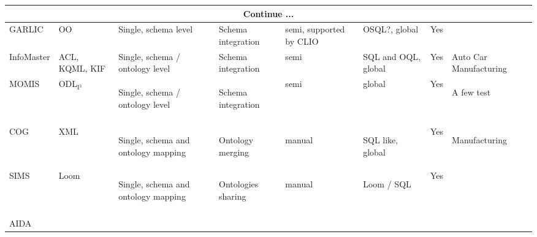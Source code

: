 \begin{longtable}{|p{}|p{}|p{}|p{}|p{}|p{}|p{}|p{}|}
\hline 
\multicolumn{8}{|c|}{Continue ...}\tabularnewline
\hline
\endfoot
\endlastfoot
\hline 
{\tiny GARLIC}&
{\tiny OO}&
{\tiny Single, schema level}&
{\tiny Schema integration}&
{\tiny semi, supported by CLIO}&
{\tiny OSQL?, global}&
{\tiny Yes}&
\tabularnewline
\hline 
{\tiny InfoMaster}&
{\tiny ACL, KQML, KIF}&
{\tiny Single, schema / ontology level}&
{\tiny Schema integration}&
{\tiny semi}&
{\tiny SQL and OQL, global}&
{\tiny Yes}&
{\tiny Auto Car Manufacturing}\tabularnewline
\hline 
{\tiny MOMIS}&
{\tiny ODL$_{\textrm{I$^{\textrm{3}}$}}$}&
\begin{spacing}{0.7}
{\tiny Single, schema / ontology level}\end{spacing}
&
\begin{spacing}{0.7}
{\tiny Schema integration}\end{spacing}
&
{\tiny semi}&
{\tiny global}&
{\tiny Yes}&
\begin{spacing}{0.7}
{\tiny A few test}\end{spacing}
\tabularnewline
\hline 
&
&
&
&
&
&
&
\tabularnewline
\hline 
{\tiny COG}&
{\tiny XML}&
\begin{spacing}{0.7}
{\tiny Single, schema and ontology mapping}\end{spacing}
&
\begin{spacing}{0.7}
{\tiny Ontology merging}\end{spacing}
&
\begin{spacing}{0.7}
{\tiny manual}\end{spacing}
&
\begin{spacing}{0.7}
{\tiny SQL like, global}\end{spacing}
&
{\tiny Yes}&
\begin{spacing}{0.7}
{\tiny Manufacturing}\end{spacing}
\tabularnewline
\hline 
{\tiny SIMS}&
{\tiny Loom}&
\begin{spacing}{0.7}
{\tiny Single, schema and ontology mapping}\end{spacing}
&
\begin{spacing}{0.7}
{\tiny Ontologies sharing}\end{spacing}
&
\begin{spacing}{0.7}
{\tiny manual}\end{spacing}
&
\begin{spacing}{0.7}
{\tiny Loom / SQL}\end{spacing}
&
{\tiny Yes}&
\tabularnewline
\hline 
&
&
&
&
&
&
&
\tabularnewline
\hline 
{\tiny AIDA}&
&
\begin{spacing}{0.7}

\end{spacing}
\end{longtable}

